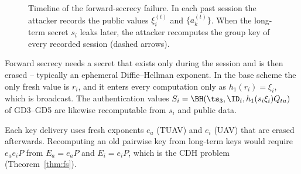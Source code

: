 \begin{figure}[H]
\centering
{}
\caption{Timeline of the forward-secrecy failure. In each past session the attacker records the public values $\xi_i^{(t)}$ and $\{a_k^{(t)}\}$. When the long-term secret $s_i$ leaks later, the attacker recomputes the group key of every recorded session (dashed arrows).}
\label{fig:f3time}
\end{figure}


\begin{remark}
Forward secrecy needs a secret that exists only during the session and is then erased -- typically an ephemeral Diffie--Hellman exponent. In the base
scheme the only fresh value is $r_i$, and it enters every computation only as $h_1(r_i)=\xi_i$, which is broadcast. The authentication values
$S_i=\BH(\ts_3,\ID_i,h_1(s_i\xi_i)Q_{tu})$ of GD3--GD5 are likewise recomputable from $s_i$ and public data.
\end{remark}

\begin{fixbox}[title={How C1 removes F3 (Chapter~\ref*{ch:c1})}]
Each key delivery uses fresh exponents $e_a$ (TUAV) and $e_i$ (UAV) that are erased afterwards. Recomputing an old pairwise key from long-term keys would
require $e_ae_iP$ from $E_a=e_aP$ and $E_i=e_iP$, which is the CDH problem (Theorem~\ref{thm:fs}).
\end{fixbox}
